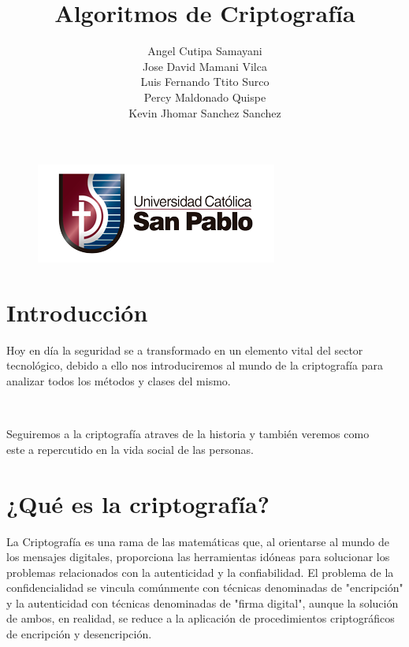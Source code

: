 \documentclass[11pt, conference]{IEEEtran}
\begin{document}
\title{\bf Algoritmos de Criptografía}
\author{Angel Cutipa Samayani \\
	Jose David Mamani Vilca\\
	Luis Fernando Ttito Surco\\
	Percy Maldonado Quispe \\
	Kevin Jhomar Sanchez Sanchez \\
	}

\onecolumn
\maketitle

\begin{figure}[h]
	\centering
	\includegraphics[scale=0.6]{ucsp.png}
\end{figure}
\bigskip\bigskip\bigskip\bigskip\bigskip
\bigskip\bigskip\bigskip\bigskip\bigskip

\section{Introducción}
\begin{center}
Hoy en día la seguridad se a transformado en un elemento vital del sector \\ tecnológico,  debido a ello nos introduciremos al mundo de la criptografía para \\ analizar todos los métodos y clases del mismo.

\

Seguiremos a la criptografía atraves de la historia y también veremos como \\ este a repercutido en la vida social de las personas.
\end{center}
\twocolumn

\pagebreak 

\tableofcontents 

\bigskip\bigskip\bigskip\bigskip\bigskip
\bigskip\bigskip\bigskip\bigskip

\pagebreak

\section{¿Qué es la criptografía?}
La Criptografía es una rama de las matemáticas que, al orientarse al mundo de los mensajes digitales, proporciona las herramientas idóneas para solucionar los problemas relacionados con la autenticidad y la confiabilidad. El problema de la confidencialidad se vincula comúnmente con técnicas denominadas de "encripción" y la autenticidad con técnicas denominadas de "firma digital", aunque la solución de ambos, en realidad, se reduce a la aplicación de procedimientos criptográficos de encripción y desencripción.\cite{c}
\end{document}
